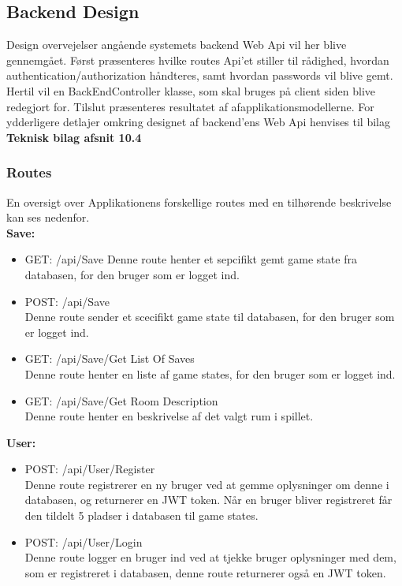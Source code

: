 \subsection{Backend Design}
\label{ssec: Backend Design}
Design overvejelser  angående systemets backend Web Api vil her blive gennemgået. Først præsenteres hvilke routes Api'et stiller til rådighed, hvordan authentication/authorization håndteres, samt hvordan passwords vil blive gemt. Hertil vil en BackEndController klasse, som skal bruges på client siden blive redegjort for. Tilslut præsenteres resultatet af afapplikationsmodellerne. For ydderligere detlajer omkring designet af backend'ens Web Api henvises til bilag \textbf{Teknisk bilag afsnit 10.4}


\subsubsection{Routes}
En oversigt over Applikationens forskellige routes med en tilhørende beskrivelse kan ses nedenfor.\\

\textbf{Save:}\\
\begin{itemize}
\item GET: /api/Save
Denne route henter et sepcifikt gemt game state fra databasen, for den bruger som er logget ind.
\item POST: /api/Save\\
Denne route sender et scecifikt game state til databasen, for den bruger som er logget ind.
\item GET: /api/Save/Get List Of Saves\\
Denne route henter en liste af game states, for den bruger som er logget ind. 
\item GET: /api/Save/Get Room Description\\
Denne route henter en beskrivelse af det valgt rum i spillet.
\end{itemize}

\textbf{User:}\\
\begin{itemize}
\item POST: /api/User/Register\\
Denne route registrerer en ny bruger ved at gemme oplysninger om denne i databasen, og returnerer en JWT token. Når en bruger bliver registreret får den tildelt 5 pladser i databasen til game states.
\item POST: /api/User/Login\\
Denne route logger en bruger ind ved at tjekke bruger oplysninger med dem, som er registreret i databasen, denne route returnerer også en JWT token.
\end{itemize}


